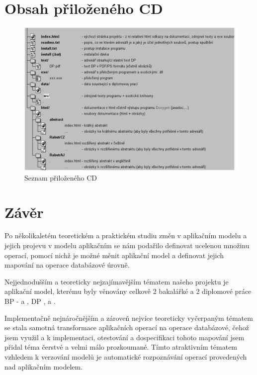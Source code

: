 \documentclass[11pt,twoside,a4paper]{book}
\begin{document}
\chapter{Obsah přiloženého CD}


\begin{figure}[h]
\begin{center}
\includegraphics[width=14cm]{figures/seznamcd}
\caption{Seznam přiloženého CD}
\label{fig:seznamcd}
\end{center}
\end{figure}

\chapter{Závěr}
Po několikaletém teoretickém a praktickém studiu změn v aplikačním modelu a
jejich projevu v modelu aplikačním se nám podařilo definovat ucelenou množinu
operací, pomocí nichž je možné měnit aplikační model a definovat jejich mapování
na operace databázové úrovně.

Nejjednodušším a teoreticky nejzajímavějším tématem našeho projektu je aplikační
model, kterému byly věnovány celkově 2 bakalářké a 2 diplomové práce
BP - \cite{Tarant_bp} a  \cite{Lukes}, DP \cite{Tarant_dip},  a \cite{Mazanec}.

Implementačně nejnáročnějším a zároveň nejvíce teoreticky vyčerpaným tématem se
stala samotná transformace aplikačních operací na operace databázové, čehož jsem
využil a k implementaci, otestování a dospecifikaci tohoto mapování jsem přidal
téma čerstvé a velmi málo prozkoumané. Tímto atraktivním tématem vzhledem k
verzování modelů je automatické rozpoznávání operací provedených nad aplikačním
modelem.
\end{document}
